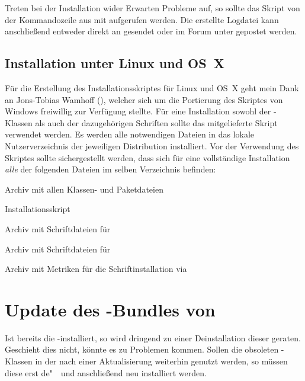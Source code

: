 \documentclass[%
  english,ngerman,%
  headings=optiontoheadandtoc,captions=tableheading,numbers=noenddot,%
  chapterpage,cdfoot,%
]{tudscrman}
\newlength{\tempdim}
\begin{document}
Treten bei der Installation wider Erwarten Probleme auf, so sollte das Skript 
von der Kommandozeile aus mit 
aufgerufen werden. Die erstellte Logdatei kann anschließend entweder direkt an 
\Email{\filemail} gesendet oder im Forum unter \forum gepostet werden.

\subsection{Installation unter Linux und OS~X}
Für die Erstellung des Installationsskriptes für Linux und OS~X geht mein Dank 
an Jons-Tobias Wamhoff (), welcher sich um die 
Portierung des Skriptes von Windows freiwillig zur Verfügung stellte.  Für eine 
Installation sowohl der \TUDScript-Klassen als auch der dazugehörigen Schriften 
sollte das mitgelieferte Skript  verwendet 
werden. Es werden alle notwendigen Dateien in das lokale Nutzerverzeichnis der 
jeweiligen Distribution installiert. Vor der Verwendung des Skriptes sollte 
sichergestellt werden, dass sich für eine vollständige Installation \emph{alle} 
der folgenden Dateien im selben Verzeichnis befinden:
%
%
\begin{description}[labelwidth=\tempdim,labelsep=1em]
  \item[\File{tudscr\_\vTUDScript.zip}]Archiv mit allen Klassen- und Paketdateien
  \item[\File{tudscr\_\vTUDScript\_install.sh}]Installationsskript
  \item[\File{Univers\_PS.zip}]Archiv mit Schriftdateien für \Univers
  \item[\File{DIN\_Bd\_PS.zip}]Archiv mit Schriftdateien für \DIN
  \item[\File{tudscrfont.zip}]Archiv mit Metriken für die Schriftinstallation   
    via 
\end{description}


\section{Update des \TUDScript-Bundles von \vTUD}
%
%
%
%
Ist bereits die \TUDScript-\vTUD installiert, so wird dringend zu einer 
Deinstallation dieser geraten. Geschieht dies nicht, könnte es zu Problemen 
kommen. Sollen die obsoleten \TUDScript-Klassen in der \vTUD nach einer 
Aktualisierung weiterhin genutzt werden, so müssen diese erst de"~~und 
anschließend neu installiert werden.
\end{document}
